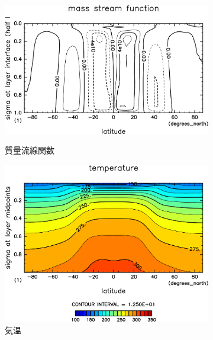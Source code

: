 \documentclass[body]{subfiles}
\begin{document}
\begin{figure}[t]
\begin{subfigure}{.4\textwidth}
		\includegraphics[width=\textwidth]{S1600/MSF,time=3650:4015-crop-rotate.pdf}
		\\\vspace{13pt}
		\caption{質量流線関数\hmu*{[kg/s]}}\label{S1600質量流線関数}
	\end{subfigure}
	\begin{subfigure}{.4\textwidth}
		\centering
		\includegraphics[width=\textwidth]{S1600/Temp,time=3650:4015-crop-rotate.pdf}
		\caption{気温\hmu*{[K]}}\label{S1600気温分布}
	\end{subfigure}
	\begin{subfigure}{.4\textwidth}
		\centering

\end{subfigure}
\end{figure}
\end{document}

